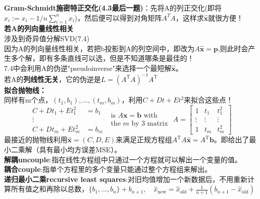     \textbf{Gram-Schmidt施密特正交化(4.3最后一题)}：先将A的列正交化(即将$x_i := x_i - 1/n\sum_{i=1}^{n}x_i$)，然后便可以得到对角矩阵$A^T A$，这样求$\widehat{\bm{x}}$就很方便！
    \\
    \textbf{若A的列向量线性相关}\\
    涉及到奇异值分解SVD(7.4)\\
    因为A的列向量线性相关，若把b投影到A的列空间中，即改为$A \widehat{\boldsymbol{x}}=\boldsymbol{p}$,则此时会产生多个解，即有多条直线可以选，但是不知道哪条是最佳的！
    \\
    7.4中会利用A的伪逆"pseudoinverse"来选择一个最短解$\widehat{\bm{x}}$。\\
    若A的\textbf{列线性无关}，它的伪逆是$L=\left(A^{\mathrm{T}} A\right)^{-1} A^{\mathrm{T}}$
    \\
    \textbf{拟合抛物线：}\\
    同样有m个点，$(t_{1},b_{1}), \dots, (t_{m},b_{m})$，利用$C+D t+E t^{2}$来拟合这些点！\\
    $$
    \begin{aligned} C+D t_{1}+E t_{1}^{2} &=b_{1} \\ \vdots & \\ C+D t_{m}+E t_{m}^{2} &=b_{m} \end{aligned}
    \begin{array}{l}{\text { is } A \boldsymbol{x}=\boldsymbol{b} \text { with }} \\ {\text { the } m \text { by } 3 \text { matrix }}\end{array}
    A=\left[\begin{array}{ccc}{1} & {t_{1}} & {t_{1}^{2}} \\ {\vdots} & {\vdots} & {\vdots} \\ {1} & {t_{m}} & {t_{m}^{2}}\end{array}\right]
    $$
    最接近的抛物线利用$\widehat{\boldsymbol{x}}=(C, D, E)$来满足正规方程组$A^{\mathrm{T}} A \widehat{\boldsymbol{x}}=A^{\mathrm{T}} \boldsymbol{b}$。即给出了最小二乘解（具有最小均方误差MSE）。
    \\
    \textbf{解耦uncouple}:指在线性方程组中只通过一个方程就可以解出一个变量的值。\\
    \textbf{耦合couple}:指单个方程里的多个变量只能通过整个方程组来解出。
    \\
    \textbf{递归最小二乘recursive least squares}:对旧均值增加一个新数据后，不用重新计算所有值之和再除以总数，$\{b_1,\dots, b_n\}+ b_{n+1},\quad \widehat{x}_{\mathrm{new}}=\widehat{x}_{\mathrm{old}}+\frac{1}{n+1}\left(b_{n+1}-\widehat{x}_{\mathrm{old}}\right)$
    \\
